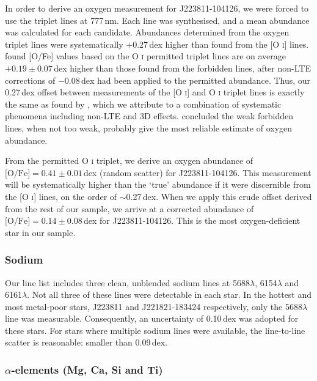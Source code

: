 \documentclass{emulateapj}
\begin{document}
In order to derive an oxygen measurement for J223811-104126, we were forced to use the triplet lines at 777\,nm. Each line was synthesised, and a mean abundance was calculated for each candidate. Abundances determined from the oxygen triplet lines were systematically $+0.27$\,dex higher than found from the [O \textsc{i}] lines. \citet{perez;et-al_2006} found [O/Fe] values based on the O \textsc{i} permitted triplet lines are on average $+0.19 \pm 0.07$\,dex higher than those found from the forbidden lines, after non-LTE corrections of $-$0.08\,dex had been applied to the permitted abundance.  Thus, our 0.27\,dex offset between measurements of the [O \textsc{i}] and O \textsc{i} triplet lines is exactly the same as found by \citet{perez;et-al_2006}, which we attribute to a combination of systematic phenomena including non-LTE and 3D effects. \citet{perez;et-al_2006} concluded the weak forbidden lines, when not too weak, probably give the most reliable estimate of oxygen abundance.

From the permitted O \textsc{i} triplet, we derive an oxygen abundance of $\mbox{[O/Fe]} = 0.41 \pm 0.01$\,dex (random scatter) for J223811-104126. This measurement will be systematically higher than the `true' abundance if it were discernible from the [O \textsc{i}] lines, on the order of ${\sim}$0.27\,dex. When we apply this crude offset derived from the rest of our sample, we arrive at a corrected abundance of $\mbox{[O/Fe]} = 0.14 \pm 0.08$\,dex for J223811-104126. This is the most oxygen-deficient star in our sample.


\subsubsection{Sodium}
\label{sec:sodium-abundances}
Our line list includes three clean, unblended sodium lines at 5688$\lambda$, 6154$\lambda$ and 6161$\lambda$. Not all three of these lines were detectable in each star. In the hottest and most metal-poor stars, J223811 and J221821-183424 respectively, only the 5688$\lambda$ line was measurable. Consequently, an uncertainty of 0.10\,dex was adopted for these stars. For stars where multiple sodium lines were available, the line-to-line scatter is reasonable: smaller than 0.09\,dex. 


\subsubsection{$\alpha$-elements (Mg, Ca, Si and Ti)}
\label{sec:alpha-elements}
\end{document}

